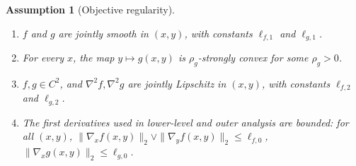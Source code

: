 \documentclass[10pt,a4paper]{amsart}
\newtheorem{assumption}{Assumption}
\begin{document}
\begin{assumption}[Objective regularity]
\label{ass:euclidean}
\leavevmode
\begin{enumerate}[leftmargin=*, label=\textup{(A\arabic*)}, ref=\textup{(A\arabic*)}]
    \item\label{ass:A1} \(f\) and \(g\) are jointly smooth in \((x,y)\), with constants
    \(\ell_{f,1}\) and \(\ell_{g,1}\).
    \item\label{ass:A2} For every \(x\), the map \(y\mapsto g(x,y)\) is \(\rho_g\)-strongly convex for some \(\rho_g>0\).
    \item\label{ass:A3} \(f,g\in C^2\), and \(\nabla^2 f,\nabla^2 g\) are jointly Lipschitz in
    \((x,y)\), with constants \(\ell_{f,2}\) and \(\ell_{g,2}\).
    \item\label{ass:A4} The first derivatives used in lower-level and outer analysis are bounded: for all
    \((x,y)\),
    \(\|\nabla_x f(x,y)\|_2\vee \|\nabla_y f(x,y)\|_2\le \ell_{f,0}\),
    \(\|\nabla_x g(x,y)\|_2\le \ell_{g,0}\).
\end{enumerate}
\end{assumption}
\end{document}
